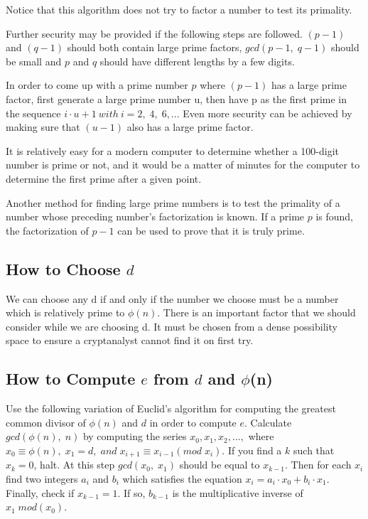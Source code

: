 \documentclass[12pt, letterpaper]{article}
\begin{document}
Notice that this algorithm does not try to factor a number to test its primality.

Further security may be provided if the following steps are followed. $(p-1)$ and $(q-1)$ should both contain large prime factors, $gcd(p-1, \; q-1)$ should be small and $p$ and $q$ should have different lengths by a few digits.

	In order to come up with a prime number $p$ where $(p-1)$ has a large prime factor, first generate a large prime number u, then have p as the first prime in the sequence $i \cdot u+1 \ with \ i=2, \; 4, \; 6,...$ Even more security can be achieved by making sure that $(u-1)$ also has a large prime factor.

	It is relatively easy for a modern computer to determine whether a 100-digit number is prime or not, and it would be a matter of minutes for the computer to determine the first prime after a given point.

	Another method for finding large prime numbers is to test the primality of a number whose preceding number’s factorization is known.  If a prime $p$ is found, the factorization of $p-1$ can be used to prove that it is truly prime.

\subsection{How to Choose $d$}

We can choose any d if and only if the number we choose must be a number which is relatively prime to $\phi(n)$. There is an important factor that we should consider while we are choosing d. It must be chosen from a dense possibility space to ensure a cryptanalyst cannot find it on first try.

\subsection{How to Compute $e$ from $d$ and $\phi$(n)}

Use the following variation of Euclid's algorithm for computing the greatest common divisor of $\phi(n)$ and $d$ in order to compute $e$. Calculate $gcd(\phi(n), \; n)$ by computing the series $x_0, x_1, x_2, ...,$ where $x_0 \equiv \phi(n), \; x_1 = d, \; and \; x_{i+1} \equiv x_{i−1} (mod \; x_i)$. If you find a $k$ such that $x_k = 0$, halt. At this step $gcd(x_0, \; x_1)$ should be equal to $x_{k-1}$. Then for each $x_i$ find two integers $a_i$ and $b_i$ which satisfies the equation $x_i = a_i \cdot x_0 + b_i \cdot x_1$. Finally, check if $x_{k-1} = 1$. If so, $b_{k-1}$ is the multiplicative inverse of $x_1 \; mod(x_0)$.
\end{document}
